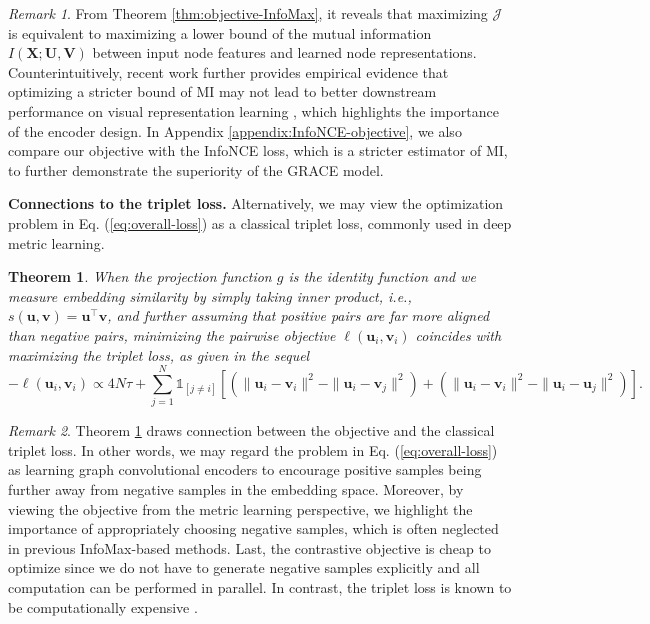 \documentclass{article}
\newtheorem{theorem}{Theorem}[section]
\theoremstyle{remark}
\newtheorem*{remark}{Remark}
\begin{document}
\begin{remark}
From Theorem \ref{thm:objective-InfoMax}, it reveals that maximizing \(\mathcal{J}\) is equivalent to maximizing a lower bound of the mutual information \(I(\mathbf X; \mathbf U, \mathbf V)\) between input node features and learned node representations.
Counterintuitively, recent work further provides empirical evidence that optimizing a stricter bound of MI may not lead to better downstream performance on visual representation learning \cite{Tschannen:2020uo}, which highlights the importance of the encoder design. In Appendix \ref{appendix:InfoNCE-objective}, we also compare our objective with the InfoNCE loss, which is a stricter estimator of MI, to further demonstrate the superiority of the GRACE model.
\end{remark}

\textbf{Connections to the triplet loss.\quad}
Alternatively, we may view the optimization problem in Eq. (\ref{eq:overall-loss}) as a classical triplet loss, commonly used in deep metric learning.
\begin{theorem}
\label{thm:objective-triplet-loss}
When the projection function \(g\) is the identity function and we measure embedding similarity by simply taking inner product, i.e., \(s(\bm{u}, \bm{v}) = \bm{u}^\top \bm{v}\), and further assuming that positive pairs are far more aligned than negative pairs, minimizing the pairwise objective \(\ell(\bm u_i, \bm v_i)\) coincides with maximizing the triplet loss, as given in the sequel
\begin{equation}
	- \ell(\bm u_i, \bm v_i) \propto 4N \tau + \sum_{j=1}^N \mathds 1_{[j \neq i]} \left[ \left(\| {\bm u_i} - {\bm v_i} \|^2 - \| {\bm u_i} - {\bm v_j} \|^2\right) + \left(\| {\bm u_i} - {\bm v_i} \|^2 - \| {\bm u_i} - {\bm u_j} \|^2\right) \right].
\end{equation}
\end{theorem}
\begin{remark}
Theorem \ref{thm:objective-triplet-loss} draws connection between the objective and the classical triplet loss.
In other words, we may regard the problem in Eq. (\ref{eq:overall-loss}) as learning graph convolutional encoders to encourage positive samples being further away from negative samples in the embedding space. Moreover, by viewing the objective from the metric learning perspective, we highlight the importance of appropriately choosing negative samples, which is often neglected in previous InfoMax-based methods. Last, the contrastive objective is cheap to optimize since we do not have to generate negative samples explicitly and all computation can be performed in parallel. In contrast, the triplet loss is known to be computationally expensive \cite{Schroff:2015wo}.
\end{remark}
\end{document}
